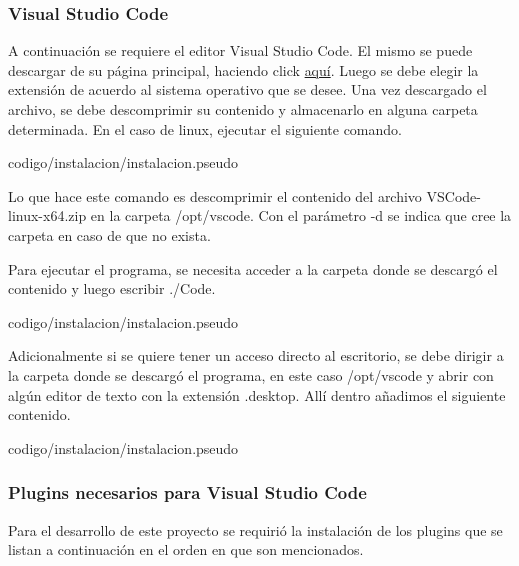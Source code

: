         
        \subsubsection{Visual Studio Code}
        A continuación se requiere el editor Visual Studio Code. El mismo se puede descargar de su página principal, haciendo click \href{https://code.visualstudio.com/Download}{aquí}. Luego se debe elegir la extensión de acuerdo al sistema operativo que se desee. Una vez descargado el archivo, se debe descomprimir su contenido y almacenarlo en alguna carpeta determinada. En el caso de linux, ejecutar el siguiente comando.

        
                     {codigo/instalacion/instalacion.pseudo}
        
        Lo que hace este comando es descomprimir el contenido del archivo VSCode-linux-x64.zip en la carpeta /opt/vscode. Con el parámetro -d se indica que cree la carpeta en caso de que no exista. 
        
        Para ejecutar el programa, se necesita acceder a la carpeta donde se descargó el contenido y luego escribir ./Code.
        
        
                     {codigo/instalacion/instalacion.pseudo}
        
        Adicionalmente si se quiere tener un acceso directo al escritorio, se debe dirigir a la carpeta donde se descargó el programa, en este caso /opt/vscode y abrir con algún editor de texto con la extensión .desktop. Allí dentro añadimos el siguiente contenido.
        
        
                     {codigo/instalacion/instalacion.pseudo}
        
        
        \subsubsection{Plugins necesarios para Visual Studio Code}
        Para el desarrollo de este proyecto se requirió la instalación de los plugins que se listan a continuación en el orden en que son mencionados.
        
